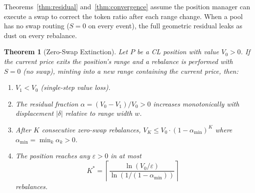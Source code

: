 \documentclass[11pt,a4paper]{article}
\newtheorem{theorem}{Theorem}
\begin{document}
Theorems~\ref{thm:residual} and~\ref{thm:convergence} assume the position manager can execute a swap to correct the token ratio after each range change. When a pool has no swap routing ($S = 0$ on every event), the full geometric residual leaks as dust on every rebalance.

\begin{theorem}[Zero-Swap Extinction]\label{thm:extinction}
Let $P$ be a CL position with value $V_0 > 0$. If the current price exits the position's range and a rebalance is performed with $S = 0$ (no swap), minting into a new range containing the current price, then:
\begin{enumerate}[label=(\roman*),leftmargin=*]
    \item $V_1 < V_0$ (single-step value loss).
    \item The residual fraction $\alpha = (V_0 - V_1)/V_0 > 0$ increases monotonically with displacement $|\delta|$ relative to range width $w$.
    \item After $K$ consecutive zero-swap rebalances, $V_K \leq V_0 \cdot (1 - \alpha_{\min})^K$ where $\alpha_{\min} = \min_k \alpha_k > 0$.
    \item The position reaches any $\varepsilon > 0$ in at most
        \[
        K^* = \left\lceil \frac{\ln(V_0/\varepsilon)}{\ln(1/(1 - \alpha_{\min}))} \right\rceil
        \]
        rebalances.
\end{enumerate}
\end{theorem}
\end{document}
